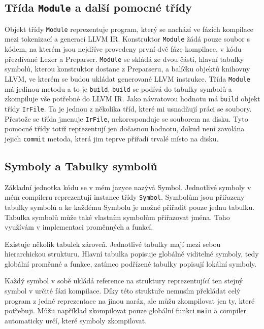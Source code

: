 \documentclass[12pt, a4paper, titlepage, abstract=on]{scrreprt}
\begin{document}
\begin{listing}[H]
\caption{Celý hlavní soubor}
\inputminted[breaklines]{cpp}{../cppcompiler/src/_main.cpp}
\end{listing}

\subsection{Třída \texttt{Module} a další pomocné třídy}
Objekt třídy \texttt{Module} reprezentuje program, který se nachází ve fázích kompilace mezi tokenizací a generací LLVM IR.
Konstruktor \texttt{Module} žádá pouze soubor s kódem, na kterém jsou nejdříve provedeny první dvě fáze kompilace, v kódu
přezdívané Lexer a Preparser. \texttt{Module} se skládá ze dvou částí, hlavní tabulky symbolů, kterou konstruktor dostane z Preparseru,
a balíčku objektů knihovny LLVM, ve kterém se budou ukládat generované LLVM instrukce. Třída \texttt{Module} má jedinou metodu a to
je \texttt{build}. \texttt{build} se podívá do tabulky symbolů a zkompiluje vše potřebné do LLVM IR. Jako návratovou hodnotu má
\texttt{build} objekt třídy \texttt{IrFile}. Ta je jednou z několika tříd, které mi usnadňují práci se soubory. Přestože se třída
jmenuje \texttt{IrFile}, nekoresponduje se souborem na disku. Tyto pomocné třídy totiž reprezentují jen dočasnou hodnotu, dokud není
zavolána jejich \texttt{commit} metoda, která jim teprve přiřadí trvalé místo na disku.
\subsection{Symboly a Tabulky symbolů}
Základní jednotka kódu se v mém jazyce nazývá Symbol. Jednotlivé symboly v mém compileru reprezentují instance třídy \texttt{Symbol}.
Symbolům jsou přiřazeny tabulky symbolů a ke každému Symbolu je možné přiřadit pouze jednu tabulku. Tabulka symbolů může také vlastním
symbolům přiřazovat jména. Toho využívám v implementaci proměnných a funkcí.

Existuje několik tabulek zároveň. Jednotlivé tabulky mají mezi sebou hierarchickou strukturu. Hlavní tabulka popisuje globálně viditelné
symboly, tedy globální proměnné a funkce, zatímco podřízené tabulky popisují lokální symboly.

Každý symbol v sobě ukládá reference na struktury reprezentující ten stejný symbol v určité fázi kompilace. Díky této struktuře nemusím
překládat celý program z jedné reprezentace na jinou naráz, ale můžu zkompilovat jen ty, které potřebuji. Můžu například zkompilovat
pouze globální funkci \texttt{main} a compiler automaticky určí, které symboly zkompilovat.
\end{document}
